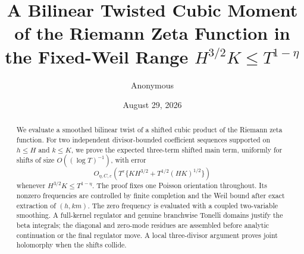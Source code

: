 \documentclass[11pt,reqno]{amsart}
\title[A Bilinear Twisted Cubic Moment]{A Bilinear Twisted Cubic Moment of the Riemann Zeta Function in the Fixed-Weil Range $H^{3/2}K\leq T^{1-\eta}$}
\author{Anonymous}
\date{August 29, 2026}
\numberwithin{equation}{section}
\theoremstyle{definition}
\newcommand{\eps}{\varepsilon}
\begin{document}
\begin{abstract}
We evaluate a smoothed bilinear twist of a shifted cubic product of the
Riemann zeta function.  For two independent divisor-bounded coefficient
sequences supported on $h\leq H$ and $k\leq K$, we prove the expected
three-term shifted main term, uniformly for shifts of size
$O((\log T)^{-1})$, with
error
\[
 O_{\eta,C,\eps}\!\left(T^\eps
 \{KH^{3/2}+T^{1/2}(HK)^{1/2}\}\right)
\]
whenever $H^{3/2}K\leq T^{1-\eta}$.  The proof fixes one Poisson orientation
throughout.  Its nonzero frequencies are controlled by finite completion and
the Weil bound after exact extraction of $(h,km)$.  The zero frequency is
evaluated with a coupled two-variable smoothing.  A full-kernel regulator and
genuine branchwise Tonelli domains justify the beta integrals; the diagonal
and zero-mode residues are assembled before analytic continuation or the
final regulator move.  A local three-divisor argument proves joint
holomorphy when the shifts collide.
\end{abstract}

\maketitle
\tableofcontents











\appendix




\end{document}
